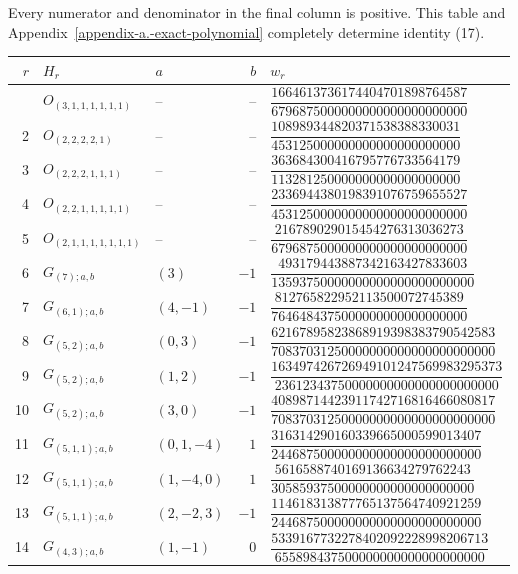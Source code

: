 \documentclass[11pt]{article}
\begin{document}
Every numerator and denominator in the final column is positive. This
table and Appendix~\ref{appendix-a.-exact-polynomial} completely determine identity (17).

\begingroup
\small
\renewcommand{\arraystretch}{1.5}
\begin{longtable}{@{}rllrl@{}}
\toprule
$r$ & $H_r$ & $a$ & $b$ & $w_r$ \\
\midrule
\endhead
\bottomrule
\endlastfoot
1 & \(O_{(3,1,1,1,1,1,1)}\) & -- & -- & \(\dfrac{1664613736174404701898764587}{6796875000000000000000000000}\) \\[6pt]
2 & \(O_{(2,2,2,2,1)}\) & -- & -- & \(\dfrac{108989344820371538388330031}{453125000000000000000000000}\) \\[6pt]
3 & \(O_{(2,2,2,1,1,1)}\) & -- & -- & \(\dfrac{363684300416795776733564179}{113281250000000000000000000}\) \\[6pt]
4 & \(O_{(2,2,1,1,1,1,1)}\) & -- & -- & \(\dfrac{2336944380198391076759655527}{4531250000000000000000000000}\) \\[6pt]
5 & \(O_{(2,1,1,1,1,1,1,1)}\) & -- & -- & \(\dfrac{216789029015454276313036273}{6796875000000000000000000000}\) \\[6pt]
6 & \(G_{(7);a,b}\) & \((3)\) & \(-1\) & \(\dfrac{493179443887342163427833603}{13593750000000000000000000000}\) \\[6pt]
7 & \(G_{(6,1);a,b}\) & \((4,-1)\) & \(-1\) & \(\dfrac{812765822952113500072745389}{7646484375000000000000000000}\) \\[6pt]
8 & \(G_{(5,2);a,b}\) & \((0,3)\) & \(-1\) & \(\dfrac{62167895823868919398383790542583}{70837031250000000000000000000000}\) \\[6pt]
9 & \(G_{(5,2);a,b}\) & \((1,2)\) & \(-1\) & \(\dfrac{163497426726949101247569983295373}{23612343750000000000000000000000}\) \\[6pt]
10 & \(G_{(5,2);a,b}\) & \((3,0)\) & \(-1\) & \(\dfrac{40898714423911742716816466080817}{70837031250000000000000000000000}\) \\[6pt]
11 & \(G_{(5,1,1);a,b}\) & \((0,1,-4)\) & \(1\) & \(\dfrac{316314290160339665000599013407}{244687500000000000000000000000}\) \\[6pt]
12 & \(G_{(5,1,1);a,b}\) & \((1,-4,0)\) & \(1\) & \(\dfrac{5616588740169136634279762243}{30585937500000000000000000000}\) \\[6pt]
13 & \(G_{(5,1,1);a,b}\) & \((2,-2,3)\) & \(-1\) & \(\dfrac{114618313877765137564740921259}{244687500000000000000000000000}\) \\[6pt]
14 & \(G_{(4,3);a,b}\) & \((1,-1)\) & \(0\) & \(\dfrac{5339167732278402092228998206713}{655898437500000000000000000000}\) \\[6pt]

\end{longtable}
\end{document}
